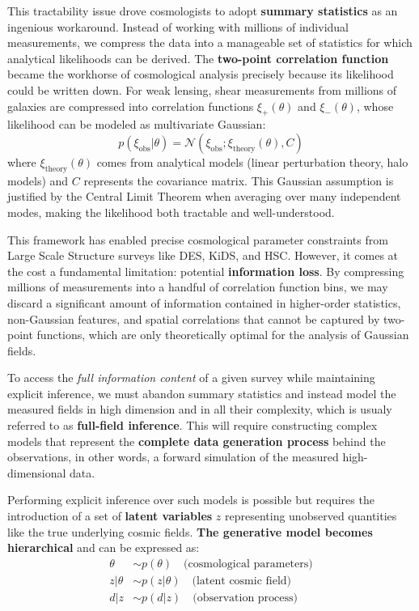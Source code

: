 \documentclass{SciPost}
\begin{document}
This tractability issue drove cosmologists to adopt \textbf{summary statistics} as an ingenious workaround. Instead of working with millions of individual measurements, we compress the data into a manageable set of statistics for which analytical likelihoods can be derived. The \textbf{two-point correlation function} became the workhorse of cosmological analysis precisely because its likelihood could be written down. For weak lensing, shear measurements from millions of galaxies are compressed into correlation functions $\xi_+(\theta)$ and $\xi_-(\theta)$, whose likelihood can be modeled as multivariate Gaussian:
\begin{equation}
    p(\xi_{\text{obs}}|\theta) = \mathcal{N}(\xi_{\text{obs}}; \xi_{\text{theory}}(\theta), C)
\end{equation}
where $\xi_{\text{theory}}(\theta)$ comes from analytical models (linear perturbation theory, halo models) and $C$ represents the covariance matrix. This Gaussian assumption is justified by the Central Limit Theorem when averaging over many independent modes, making the likelihood both tractable and well-understood.

This framework has enabled precise cosmological parameter constraints from Large Scale Structure surveys like DES, KiDS, and HSC. However, it comes at the cost a fundamental limitation: potential \textbf{information loss}. By compressing millions of measurements into a handful of correlation function bins, we may discard a significant amount of information contained in higher-order statistics, non-Gaussian features, and spatial correlations that cannot be captured by two-point functions, which are only theoretically optimal for the analysis of Gaussian fields.

To access the \textit{full information content} of a given survey while maintaining explicit inference, we must abandon summary statistics and instead model the measured fields in high dimension and in all their complexity, which is usualy referred to as \textbf{full-field inference}. This will require constructing complex models that represent the \textbf{complete data generation process} behind the observations, in other words, a forward simulation of the measured high-dimensional data.

Performing explicit inference over such models is possible but requires the introduction of a set of \textbf{latent variables} $z$ representing unobserved quantities like the true underlying cosmic fields. \textbf{The generative model becomes hierarchical} and can be expressed as:
\begin{align}
    \theta &\sim p(\theta) \quad \text{(cosmological parameters)} \\
    z|\theta &\sim p(z|\theta) \quad \text{(latent cosmic field)} \\
    d|z &\sim p(d|z) \quad \text{(observation process)}
\end{align}
\end{document}

